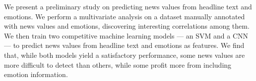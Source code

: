 We present a preliminary study on predicting news values from headline text and emotions. We perform a multivariate analysis on a dataset manually annotated with news values and emotions, discovering interesting correlations among them. We then train two competitive machine learning models --- an SVM and a CNN --- to predict news values from headline text and emotions as features. We find that, while both models yield a satisfactory performance, some news values are more difficult to detect than others, while some profit more from including emotion information.
